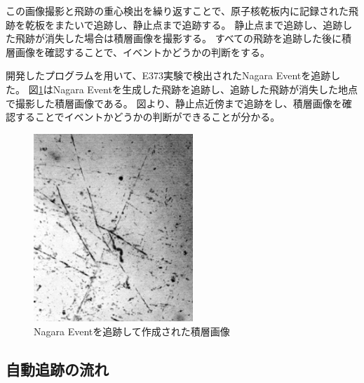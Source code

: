 \documentclass[12pt,a4paper]{jarticle}
\begin{document}
\par
この画像撮影と飛跡の重心検出を繰り返すことで、原子核乾板内に記録された飛跡を乾板をまたいで追跡し、静止点まで追跡する。
静止点まで追跡し、追跡した飛跡が消失した場合は積層画像を撮影する。
すべての飛跡を追跡した後に積層画像を確認することで、イベントかどうかの判断をする。
\par
開発したプログラムを用いて、E373実験で検出されたNagara Eventを追跡した。
図\ref{fig:nagara_sekisou}はNagara Eventを生成した飛跡を追跡し、追跡した飛跡が消失した地点で撮影した積層画像である。
図より、静止点近傍まで追跡をし、積層画像を確認することでイベントかどうかの判断ができることが分かる。
\begin{figure}[htbp]
  \centering
     \includegraphics[width=60mm]{superimpsed_org4.png}
  \caption{Nagara Eventを追跡して作成された積層画像\label{fig:nagara_sekisou}}
\end{figure}
\newpage
\subsection{自動追跡の流れ}
\end{document}

